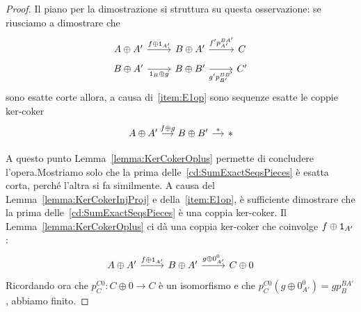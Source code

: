 \begin{proof}
  Il piano per la dimostrazione si struttura su questa osservazione: se
  riusciamo a dimostrare che
  \begin{equation}
    \begin{tikzcd}[row sep=tiny]
      A \oplus A' \ar["{f \oplus \id_{A'}}", r] & B \oplus A' \ar["{f' p_{A'}^{BA'}}",
      r] & C \\
      B \oplus A' \ar["{\id_B \oplus g}", r, swap] & B \oplus B' \ar["{g'
        p_{B'}^{BB'}}", r, swap] & C'
    \end{tikzcd}
    \label{cd:SumExactSeqsPieces}
  \end{equation}
  sono esatte corte allora, a causa di~\ref{item:E1op} sono sequenze
  esatte le coppie ker-coker
  \[
    \begin{tikzcd}[column sep=small, row sep=tiny]
      A \oplus A' \ar["{f \oplus g}", r] & B \oplus B' \ar["\ast",
      r] & \ast \\
    \end{tikzcd}
  \]
  A questo punto Lemma~\ref{lemma:KerCokerOplus} permette di concludere
  l'opera.\newline Mostriamo solo che la prima
  delle~\eqref{cd:SumExactSeqsPieces} è esatta corta, perché l'altra si
  fa similmente. A causa del Lemma~\ref{lemma:KerCokerInjProj} e
  della~\ref{item:E1op}, è sufficiente dimostrare che la prima
  delle~\ref{cd:SumExactSeqsPieces} è una coppia ker-coker. Il
  Lemma~\ref{lemma:KerCokerOplus} ci dà una coppia ker-coker che
  coinvolge \(f \oplus \mathtt 1_{A'}\):
  \[
    \begin{tikzcd}
      A \oplus A' \ar["{f \oplus \id_{A'}}", r] & B \oplus A' \ar["{g
        \oplus 0_{A'}^0}", r] & C \oplus 0
    \end{tikzcd}
  \]
  Ricordando ora che \(p_{C}^{C0} : C \oplus 0 \to C\) è un isomorfismo
  e che \(p_{C}^{C0} \left( g \oplus 0_{A'}^0 \right) = g p_{B}^{BA'}\),
  abbiamo finito.
\end{proof}


